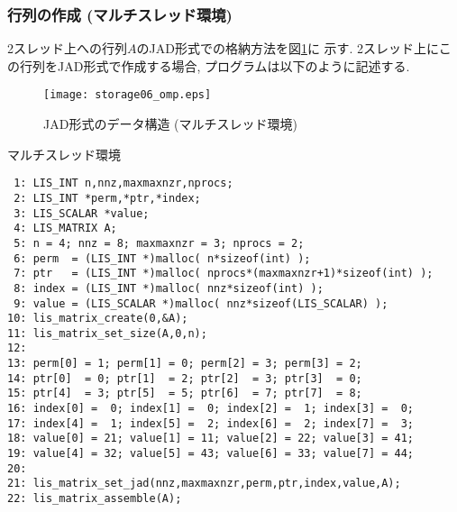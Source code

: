 \documentclass[a4paper]{jarticle}
\begin{document}
{{\subsubsection{行列の作成 (マルチスレッド環境)}
2スレッド上への行列$A$のJAD形式での格納方法を図\ref{fig:storage06_omp}に
示す. 
2スレッド上にこの行列をJAD形式で作成する場合, プログラムは以下のように記述する. 
\begin{figure}[h]
{\centering 
\texttt{[image: storage06\_omp.eps]} 
\caption{JAD形式のデータ構造 (マルチスレッド環境)}\label{fig:storage06_omp}}
\end{figure}
\begin{itembox}[l]{マルチスレッド環境}
\small
\begin{verbatim}
 1: LIS_INT n,nnz,maxmaxnzr,nprocs;
 2: LIS_INT *perm,*ptr,*index;
 3: LIS_SCALAR *value;
 4: LIS_MATRIX A;
 5: n = 4; nnz = 8; maxmaxnzr = 3; nprocs = 2;
 6: perm  = (LIS_INT *)malloc( n*sizeof(int) );
 7: ptr   = (LIS_INT *)malloc( nprocs*(maxmaxnzr+1)*sizeof(int) );
 8: index = (LIS_INT *)malloc( nnz*sizeof(int) );
 9: value = (LIS_SCALAR *)malloc( nnz*sizeof(LIS_SCALAR) );
10: lis_matrix_create(0,&A);
11: lis_matrix_set_size(A,0,n);
12:
13: perm[0] = 1; perm[1] = 0; perm[2] = 3; perm[3] = 2;
14: ptr[0]  = 0; ptr[1]  = 2; ptr[2]  = 3; ptr[3]  = 0;
15: ptr[4]  = 3; ptr[5]  = 5; ptr[6]  = 7; ptr[7]  = 8;
16: index[0] =  0; index[1] =  0; index[2] =  1; index[3] =  0;
17: index[4] =  1; index[5] =  2; index[6] =  2; index[7] =  3;
18: value[0] = 21; value[1] = 11; value[2] = 22; value[3] = 41;
19: value[4] = 32; value[5] = 43; value[6] = 33; value[7] = 44;
20:
21: lis_matrix_set_jad(nnz,maxmaxnzr,perm,ptr,index,value,A);
22: lis_matrix_assemble(A);
\end{verbatim}
\end{itembox}

\newpage
}}
\end{document}
